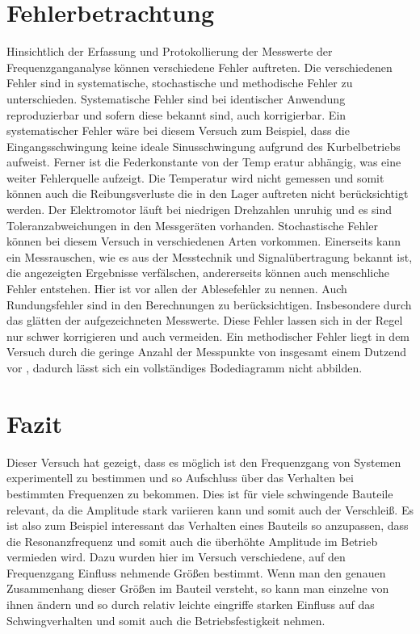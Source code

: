 \documentclass[a4paper,12pt]{scrartcl}
\begin{document}
\section{Fehlerbetrachtung}
Hinsichtlich der Erfassung und Protokollierung der Messwerte der
Frequenzganganalyse können verschiedene Fehler auftreten. Die verschiedenen Fehler
sind in systematische, stochastische und methodische Fehler zu unterschieden.
Systematische Fehler sind bei identischer Anwendung reproduzierbar und sofern diese
bekannt sind, auch korrigierbar. Ein systematischer Fehler wäre bei diesem Versuch
zum Beispiel, dass die Eingangsschwingung keine ideale Sinusschwingung aufgrund
des Kurbelbetriebs aufweist. Ferner ist die Federkonstante von der Temp eratur
abhängig, was eine weiter Fehlerquelle aufzeigt. Die Temperatur wird nicht gemessen
und somit können auch die Reibungsverluste die in den Lager auftreten nicht
berücksichtigt werden. Der Elektromotor läuft bei niedrigen Drehzahlen unruhig und
es sind Toleranzabweichungen in den Messgeräten vorhanden. Stochastische Fehler
können bei diesem Versuch in verschiedenen Arten vorkommen. Einerseits kann ein
Messrauschen, wie es aus der Messtechnik und Signalübertragung bekannt ist, die
angezeigten Ergebnisse verfälschen, andererseits können auch menschliche Fehler
entstehen. Hier ist vor allen der Ablesefehler zu nennen. Auch Rundungsfehler sind
in den Berechnungen zu berücksichtigen. Insbesondere durch das glätten der
aufgezeichneten Messwerte. Diese Fehler lassen sich in der Regel nur schwer
korrigieren und auch vermeiden. Ein methodischer Fehler liegt in dem Versuch durch
die geringe Anzahl der Messpunkte von insgesamt einem Dutzend vor , dadurch lässt sich
ein vollständiges Bodediagramm nicht abbilden.

\section{Fazit}
Dieser Versuch hat gezeigt, dass es möglich ist den Frequenzgang von Systemen experimentell zu bestimmen und so Aufschluss über das Verhalten
bei bestimmten Frequenzen zu bekommen. Dies ist für viele schwingende Bauteile relevant, da die Amplitude stark variieren kann und somit auch
der Verschleiß. Es ist also zum Beispiel interessant das Verhalten eines Bauteils so anzupassen, dass die Resonanzfrequenz und somit auch die
überhöhte Amplitude im Betrieb vermieden wird. Dazu wurden hier im Versuch verschiedene, auf den Frequenzgang Einfluss nehmende Größen bestimmt.
Wenn man den genauen Zusammenhang dieser Größen im Bauteil versteht, so kann man einzelne von ihnen ändern und so durch relativ leichte eingriffe
starken Einfluss auf das Schwingverhalten und somit auch die Betriebsfestigkeit nehmen.
\pagebreak
\nocite{*}
\sloppy %
\printbibliography
\end{document}
